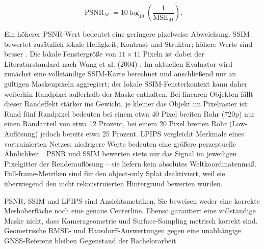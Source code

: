 \begin{equation}
	\operatorname{PSNR}_M=10\log_{10}\!\left(\frac{1}{\operatorname{MSE}_M}\right).
	\label{eq:masked-psnr}
\end{equation}

Ein höherer PSNR-Wert bedeutet eine geringere pixelweise Abweichung. SSIM
bewertet zusätzlich lokale Helligkeit, Kontrast und Struktur; höhere Werte
sind besser \parencite{wang2004ssim}. Die lokale Fenstergröße von
$11\times11$ Pixeln ist dabei der Literaturstandard nach Wang et al. (2004)
\parencite{wang2004ssim}. Im aktuellen Evaluator wird zunächst eine
vollständige SSIM-Karte berechnet und anschließend nur an gültigen
Maskenpixeln aggregiert; der lokale SSIM-Fensterkontext kann daher weiterhin
Randpixel außerhalb der Maske enthalten. Bei linearen Objekten fällt dieser
Randeffekt stärker ins Gewicht, je kleiner das Objekt im Pixelraster ist:
Rund fünf Randpixel bedeuten bei einem etwa 40 Pixel breiten Rohr (720p)
nur einen Randanteil von etwa 12 Prozent, bei einem 20 Pixel breiten Rohr
(Low-Auflösung) jedoch bereits etwa 25 Prozent. LPIPS vergleicht Merkmale eines
vortrainierten Netzes; niedrigere Werte bedeuten eine größere perzeptuelle
Ähnlichkeit \parencite{zhang2018lpips}. PSNR und SSIM bewerten stets nur das
Signal im jeweiligen Pixelgitter der Renderauflösung – sie liefern kein
absolutes Weltkoordinatenmaß. Full-frame-Metriken sind
für den object-only Splat deaktiviert, weil sie überwiegend den nicht
rekonstruierten Hintergrund bewerten würden.

PSNR, SSIM und LPIPS sind Ansichtsmetriken. Sie beweisen weder eine korrekte
Meshoberfläche noch eine genaue Centerline. Ebenso garantiert eine vollständige
Maske nicht, dass Kamerageometrie und Surface-Sampling metrisch korrekt sind.
Geometrische RMSE- und Hausdorff-Auswertungen gegen eine unabhängige
GNSS-Referenz bleiben Gegenstand der Bachelorarbeit.
